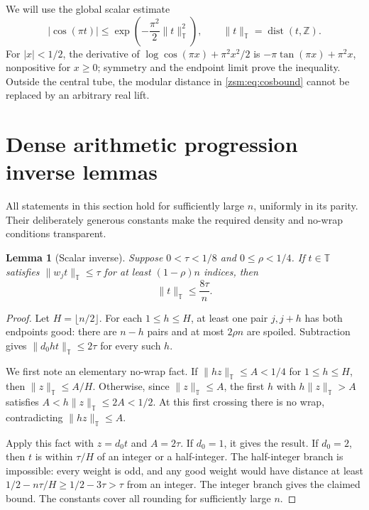 \documentclass[11pt]{article}
\newtheorem{lemma}[theorem]{Lemma}
\theoremstyle{definition}\newtheorem{definition}[theorem]{Definition}
\theoremstyle{remark}\newtheorem{remark}[theorem]{Remark}
\newcommand{\Z}{\mathbb Z}
\newcommand{\T}{\mathbb T}
\newcommand{\dist}{\operatorname{dist}}
\newcommand{\normT}[1]{\lVert #1\rVert_{\T}}
\begin{document}
We will use the global scalar estimate
\begin{equation}\label{zsm:eq:cosbound}
 |\cos(\pi t)|\le
 \exp\left(-\frac{\pi^2}2\normT{t}^2\right),
 \qquad \normT{t}=\dist(t,\Z).
\end{equation}
For $|x|<1/2$, the derivative of $\log\cos(\pi x)+\pi^2x^2/2$ is
$-\pi\tan(\pi x)+\pi^2x$, nonpositive for $x\ge0$; symmetry and the endpoint
limit prove the inequality. Outside the central tube, the modular distance in
\eqref{zsm:eq:cosbound} cannot be replaced by an arbitrary real lift.

\section{Dense arithmetic progression inverse lemmas}\label{zsm:sec:inverselemmas}
All statements in this section hold for sufficiently large $n$, uniformly in
its parity. Their deliberately generous constants make the required density
and no-wrap conditions transparent.

\begin{lemma}[Scalar inverse]\label{zsm:lem:scalar}
Suppose $0<\tau<1/8$ and $0\le\rho<1/4$. If $t\in\T$ satisfies
$\normT{w_jt}\le\tau$ for at least $(1-\rho)n$ indices, then
\[
 \normT{t}\le\frac{8\tau}{n}.
\]
\end{lemma}
\begin{proof}
Let $H=\lfloor n/2\rfloor$. For each $1\le h\le H$, at least one pair
$j,j+h$ has both endpoints good: there are $n-h$ pairs and at most $2\rho n$
are spoiled. Subtraction gives $\normT{d_0ht}\le2\tau$ for every such $h$.

We first note an elementary no-wrap fact. If $\normT{hz}\le A<1/4$ for
$1\le h\le H$, then $\normT{z}\le A/H$. Otherwise, since
$\normT{z}\le A$, the first $h$ with $h\normT{z}>A$ satisfies
$A<h\normT{z}\le2A<1/2$. At this first crossing there is no wrap, contradicting
$\normT{hz}\le A$.

Apply this fact with $z=d_0t$ and $A=2\tau$. If $d_0=1$, it gives the result.
If $d_0=2$, then $t$ is within $\tau/H$ of an integer or a half-integer. The
half-integer branch is impossible: every weight is odd, and any good weight
would have distance at least $1/2-n\tau/H\ge1/2-3\tau>\tau$ from an integer.
The integer branch gives the claimed bound. The constants cover all rounding
for sufficiently large $n$.
\end{proof}
\end{document}
